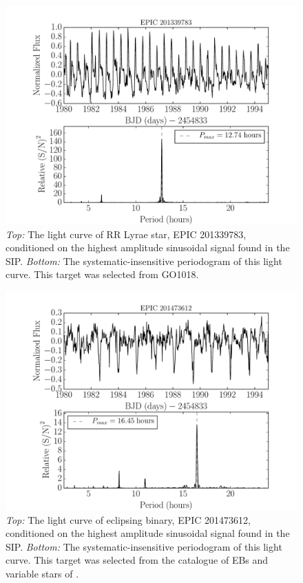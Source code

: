 \documentclass[useAMS, usenatbib, preprint, 12pt]{aastex}
\begin{document}
\begin{figure}
\begin{center}
\includegraphics[width=6in, clip=true]{RR_201339783.pdf}
\caption{{\it Top:} The light curve of RR Lyrae star, EPIC 201339783,
	conditioned on the highest amplitude sinusoidal signal found in the
	SIP. {\it Bottom:} The systematic-insensitive periodogram of
	this light curve. This target was selected from GO1018.}
\label{fig:RRLyrae}
\end{center}
\end{figure}

\begin{figure}
\begin{center}
\includegraphics[width=6in, clip=true]{EB_201473612.pdf}
\caption{{\it Top:} The light curve of eclipsing binary, EPIC 201473612,
	conditioned on the highest amplitude sinusoidal signal found in the
	SIP. {\it Bottom:} The systematic-insensitive periodogram of
	this light curve. This target was selected from the catalogue of EBs
	and variable stars of \citet{Armstrong2015}.}
\label{fig:EB}
\end{center}
\end{figure}
\end{document}
